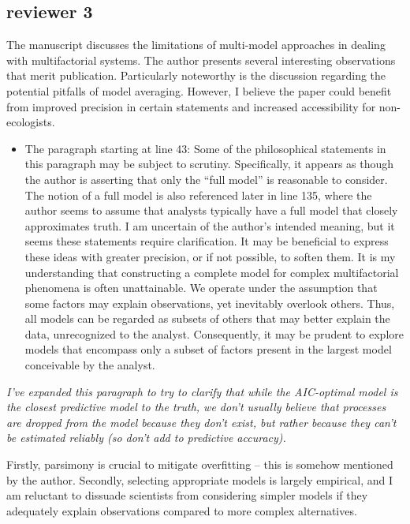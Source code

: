 \documentclass[12pt]{article}
\providecommand{\tightlist}{%
  \setlength{\itemsep}{0pt}\setlength{\parskip}{0pt}}
\begin{document}
\pagebreak

\subsection{reviewer 3}\label{reviewer-3}

The manuscript discusses the limitations of multi-model approaches in
dealing with multifactorial systems. The author presents several
interesting observations that merit publication. Particularly noteworthy
is the discussion regarding the potential pitfalls of model averaging.
However, I believe the paper could beneﬁt from improved precision in
certain statements and increased accessibility for non-ecologists.

\begin{itemize}
\tightlist
\item
  The paragraph starting at line 43: Some of the philosophical
  statements in this paragraph may be subject to scrutiny. Speciﬁcally,
  it appears as though the author is asserting that only the ``full
  model'' is reasonable to consider. The notion of a full model is also
  referenced later in line 135, where the author seems to assume that
  analysts typically have a full model that closely approximates truth.
  I am uncertain of the author's intended meaning, but it seems these
  statements require clariﬁcation. It may be beneﬁcial to express these
  ideas with greater precision, or if not possible, to soften them. It
  is my understanding that constructing a complete model for complex
  multifactorial phenomena is often unattainable. We operate under the
  assumption that some factors may explain observations, yet inevitably
  overlook others. Thus, all models can be regarded as subsets of others
  that may better explain the data, unrecognized to the analyst.
  Consequently, it may be prudent to explore models that encompass only
  a subset of factors present in the largest model conceivable by the
  analyst.
\end{itemize}

\emph{I've expanded this paragraph to try to clarify that while the
AIC-optimal model is the closest predictive model to the truth, we don't
usually believe that processes are dropped from the model because they
don't exist, but rather because they can't be estimated reliably (so
don't add to predictive accuracy).}

Firstly, parsimony is crucial to mitigate overﬁtting -- this is somehow
mentioned by the author. Secondly, selecting appropriate models is
largely empirical, and I am reluctant to dissuade scientists from
considering simpler models if they adequately explain observations
compared to more complex alternatives.
\end{document}
